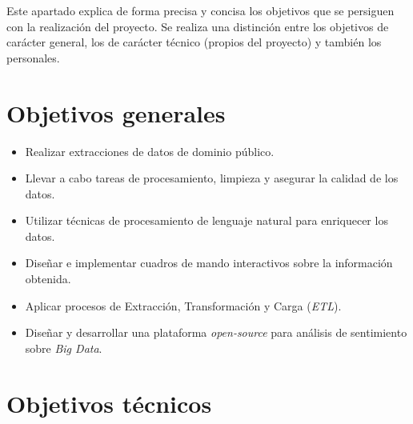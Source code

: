 
Este apartado explica de forma precisa y concisa los objetivos que se persiguen con la realización del proyecto. Se realiza una distinción entre los objetivos de carácter general, los de carácter técnico (propios del proyecto) y también los personales.

\section{Objetivos generales}

\begin{itemize}
    \item Realizar extracciones de datos de dominio público.

    \item Llevar a cabo tareas de procesamiento, limpieza y asegurar la calidad de los datos.

    \item Utilizar técnicas de procesamiento de lenguaje natural para enriquecer los datos.

    \item Diseñar e implementar cuadros de mando interactivos sobre la información obtenida.

    \item Aplicar procesos de Extracción, Transformación y Carga (\textit{ETL}).

    \item Diseñar y desarrollar una plataforma \textit{open-source} para análisis de sentimiento sobre \textit{Big Data}.
\end{itemize}

\vspace{2cm}

\section{Objetivos técnicos}

